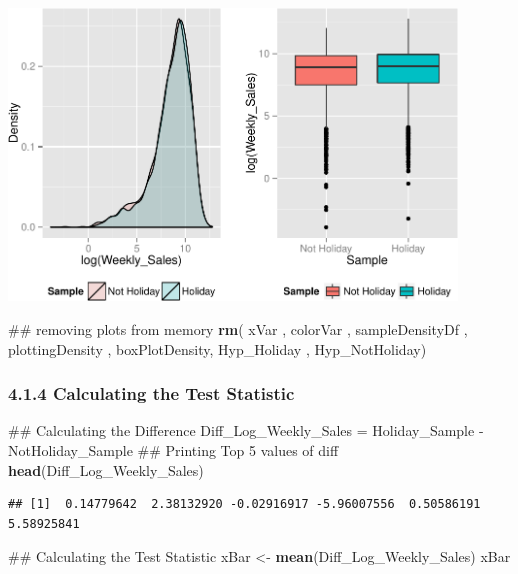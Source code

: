 \documentclass[]{article}
\newenvironment{Shaded}{\begin{snugshade}}{\end{snugshade}}
\newcommand{\KeywordTok}[1]{\textcolor[rgb]{0.13,0.29,0.53}{\textbf{{#1}}}}
\newcommand{\StringTok}[1]{\textcolor[rgb]{0.31,0.60,0.02}{{#1}}}
\newcommand{\NormalTok}[1]{{#1}}
\begin{document}
\includegraphics[width=450px]{PredictingWeeklySalesAtWalmart_files/figure-latex/visualizingTheSamplesCollected-1}

\begin{Shaded}
\begin{Highlighting}[]
\NormalTok{## removing plots from memory}
\KeywordTok{rm}\NormalTok{( xVar , colorVar , sampleDensityDf , plottingDensity , }
    \NormalTok{boxPlotDensity, Hyp_Holiday , Hyp_NotHoliday)}
\end{Highlighting}
\end{Shaded}

\subsubsection{4.1.4 Calculating the Test
Statistic}\label{calculating-the-test-statistic}

\begin{Shaded}
\begin{Highlighting}[]
\NormalTok{## Calculating the Difference}
\NormalTok{Diff_Log_Weekly_Sales =}\StringTok{ }\NormalTok{Holiday_Sample -}\StringTok{ }\NormalTok{NotHoliday_Sample}
\NormalTok{## Printing Top 5 values of diff}
\KeywordTok{head}\NormalTok{(Diff_Log_Weekly_Sales)}
\end{Highlighting}
\end{Shaded}

\begin{verbatim}
## [1]  0.14779642  2.38132920 -0.02916917 -5.96007556  0.50586191  5.58925841
\end{verbatim}

\begin{Shaded}
\begin{Highlighting}[]
\NormalTok{## Calculating the Test Statistic}
\NormalTok{xBar <-}\StringTok{ }\KeywordTok{mean}\NormalTok{(Diff_Log_Weekly_Sales)}
\NormalTok{xBar}
\end{Highlighting}
\end{Shaded}
\end{document}
